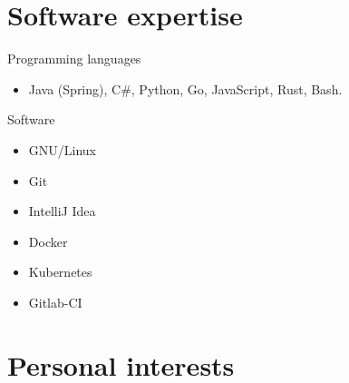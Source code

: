 \documentclass{res}
\newcommand{\inFrench}[1]{}
\newcommand{\inEnglish}[1]{#1}
\begin{document}
\begin{resume}
{	\section{Software expertise}
}
\vspace{6pt}

%

\inEnglish{
	Programming languages
	\vspace{0.05in}
	\begin{itemize}
		\item Java (Spring), C\#, Python, Go, JavaScript, Rust, Bash.
	\end{itemize}

	Software
	\vspace{0.05in}
	\begin{itemize}\itemsep -2pt
		\item GNU/Linux
		\item Git
		\item IntelliJ Idea
		\item Docker
		\item Kubernetes
		\item Gitlab-CI
	\end{itemize}
}


\inFrench{
	\section{Intérêts personnels}
}
\inEnglish{
	\section{Personal interests}
}
\vspace{6pt}



\end{resume}
\end{document}
